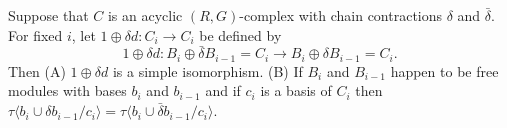 Suppose that $C$ is an acyclic $(R,G)$-complex with chain contractions $\delta$ and $\bar{\delta}$. For fixed $i$, let $1 \oplus \delta d: C_i \rightarrow C_i$ be defined by
$$1 \oplus \delta d: B_i \oplus \bar{\delta} B_{i-1} = C_i \rightarrow B_i \oplus \delta B_{i-1} = C_i.$$
Then (A) $1 \oplus \delta d$ is a simple isomorphism.
(B) If $B_i$ and $B_{i-1}$ happen to be free modules with bases $b_i$ and $b_{i-1}$ and if $c_i$ is a basis of $C_i$ then $\tau \langle b_i \cup \delta b_{i-1}/c_i \rangle = \tau \langle b_i \cup \bar{\delta} b_{i-1}/c_i \rangle$.
